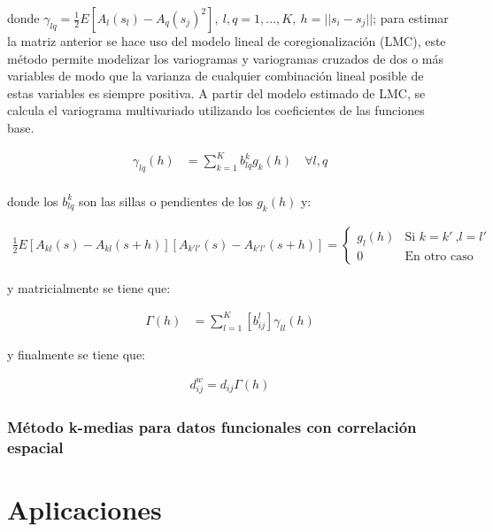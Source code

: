 \documentclass[
]{book}
\begin{document}
donde \(\gamma_{lq}=\frac{1}{2}E[A_l(s_l)-A_q(s_j)^2],\ l,q=1,...,K,\ h=||s_i-s_j||\); para estimar la matriz anterior se hace uso del modelo lineal de coregionalización (LMC), este método permite modelizar los variogramas y variogramas cruzados de dos o más variables de modo que la varianza de cualquier combinación lineal posible de estas variables es siempre positiva. A partir del modelo estimado de LMC, se calcula el variograma multivariado utilizando los coeficientes de las funciones base.

\begin{align*}
    \gamma_{lq}(h)&=\sum_{k=1}^K b_{lq}^kg_k(h)\quad \forall l,q\\
\end{align*}

donde los \(b_{lq}^k\) son las sillas o pendientes de los \(g_k(h)\) y:

\begin{align*}
    \frac{1}{2}E\left[A_{kl}(s)-A_{kl}(s+h) \right]\left[A_{k'l'}(s)-A_{k'l'}(s+h) \right]=\left \{ \begin{matrix} g_l(h) & \mbox{Si } k=k'\ \mbox{,}l=l'\\
    0 & \mbox{En otro caso }\end{matrix}\right.  
\end{align*}

y matricialmente se tiene que:

\begin{align*}
    \Gamma(h)&=\sum_{l=1}^K[b_{ij}^l]\gamma_{ll}(h)
\end{align*}

y finalmente se tiene que:

\begin{align*}
    d_{ij}^w=d_{ij}\Gamma(h)
\end{align*}

\hypertarget{muxe9todo-k-medias-para-datos-funcionales-con-correlaciuxf3n-espacial}{%
\subsection{Método k-medias para datos funcionales con correlación espacial}\label{muxe9todo-k-medias-para-datos-funcionales-con-correlaciuxf3n-espacial}}

\hypertarget{aplicaciones}{%
\chapter{Aplicaciones}\label{aplicaciones}}
\end{document}
